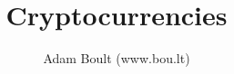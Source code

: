 \documentclass[oneside]{book}
\begin{document}
\author{Adam Boult (www.bou.lt)}
\title{Cryptocurrencies}
\maketitle

\setcounter{tocdepth}{0}
\tableofcontents


\end{document}
